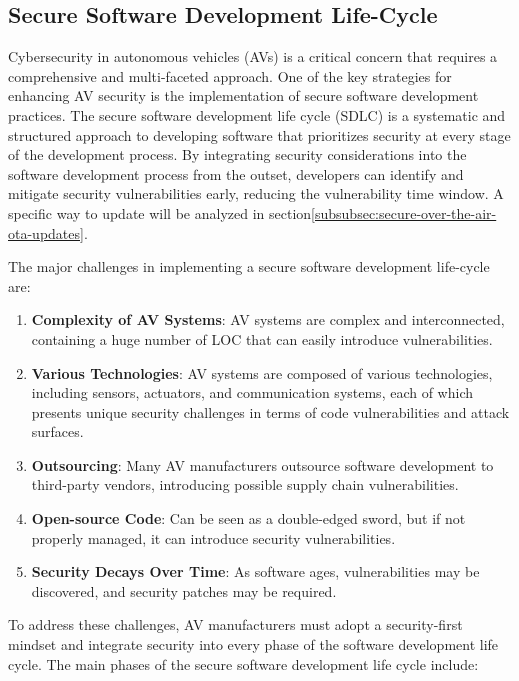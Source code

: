\subsection{Secure Software Development Life-Cycle}\label{subsec:secure-software-development-life-cycle}

Cybersecurity in autonomous vehicles (AVs) is a critical concern that requires a comprehensive and multi-faceted approach.
One of the key strategies for enhancing AV security is the implementation of secure software development practices.
The secure software development life cycle (SDLC) is a systematic and structured approach to developing software that prioritizes security at every stage of the development process.
By integrating security considerations into the software development process from the outset, developers can identify and mitigate security vulnerabilities early, reducing the vulnerability time window.
A specific way to update will be analyzed in section\ref{subsubsec:secure-over-the-air-ota-updates}.

The major challenges in implementing a secure software development life-cycle are:
\begin{enumerate}
    \item \textbf{Complexity of AV Systems}: AV systems are complex and interconnected, containing a huge number of LOC that can easily introduce vulnerabilities.
    \item \textbf{Various Technologies}: AV systems are composed of various technologies, including sensors, actuators, and communication systems, each of which presents unique security challenges in terms of code vulnerabilities and attack surfaces.
    \item \textbf{Outsourcing}: Many AV manufacturers outsource software development to third-party vendors, introducing possible supply chain vulnerabilities.
    \item \textbf{Open-source Code}: Can be seen as a double-edged sword, but if not properly managed, it can introduce security vulnerabilities.
    \item \textbf{Security Decays Over Time}: As software ages, vulnerabilities may be discovered, and security patches may be required.
\end{enumerate}

To address these challenges, AV manufacturers must adopt a security-first mindset and integrate security into every phase of the software development life cycle\cite{moukahal2021towards}.
The main phases of the secure software development life cycle include:

